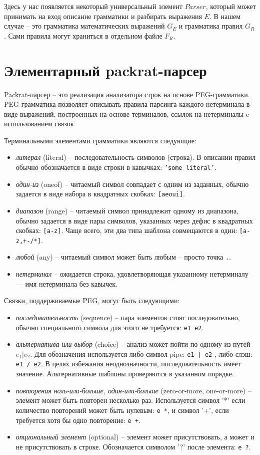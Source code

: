 \documentclass[10pt]{report}
\begin{document}
Здесь у нас появляется некоторый универсальный элемент $\boxed{Parser}$, который может принимать на вход описание грамматики и разбирать выражения $E$. 
В нашем случае -- это грамматика математических выражений $G_E$ и грамматика правил $G_R$.
Сами правила могут храниться в отдельном файле $F_R$.

\section{Элементарный packrat-парсер}
Packrat-парсер -- это реализация анализатора строк на основе PEG-грамматики. 
PEG-грамматика позволяет описывать правила парсинга каждого нетерминала в виде выражений, построенных на основе терминалов, ссылок на нетерминалы  c использованием связок.

Терминальными элементами грамматики являются следующие:
\begin{itemize}
\item {\em литерал} (literal) -- последовательность символов (строка). В описании правил обычно обозначается в виде строки в кавычках: \texttt{'some literal'}.
\item {\em один-из} (oneof) -- читаемый символ совпадает с одним из заданных, обычно задается в виде набора в квадратных скобках: \texttt{[aeoui]}.
\item {\em диапазон} (range)  -- читаемый символ принадлежит одному из диапазона, обычно задается в виде пары символов, указанных через дефис в квадратных скобках: \texttt{[a-z]}. Чаще всего, эти два типа шаблона совмещаются в один: \texttt{[a-z,+-/*]}.
\item {\em любой} (any) -- читаемый символ может быть любым -- просто точка \texttt{.}.
\item {\em нетерминал} -- ожидается строка, удовлетворяющая указанному нетерминалу --- имя нетерминала без кавычек.
\end{itemize}

Связки, поддерживаемые PEG, могут быть следующими:
\begin{itemize}
\item {\em последовательность} (sequence) -- пара элементов стоят последовательно, обычно специального символа для этого не требуется: \texttt{e1 е2}.
\item {\em альтернатива или выбор} (choice) -- анализ может пойти по одному из путей $e_1 | e_2$. Для обозначения используется либо символ pipe:  \texttt{e1 | e2} , либо слэш: \texttt{e1 / e2}. В целях избежания неоднозначности, последовательность имеет значение. Альтернативные шаблоны проверяются в указанном порядке.
\item {\em повторения ноль-или-больше, один-или-больше} (zero-or-more, one-or-more) -- элемент может быть повторен несколько раз. Используется символ '*' если количество повторений может быть нулевым: \texttt{e *}, и символ '+', если требуется хотя бы одно повторение: \texttt{e +}.
\item {\em опциональный элемент} (optional) -- элемент может присутствовать, а может и не присутствовать в строке. Обозначается символом '?' после элемента: \texttt{e ?}.
\end{itemize}
\end{document}
